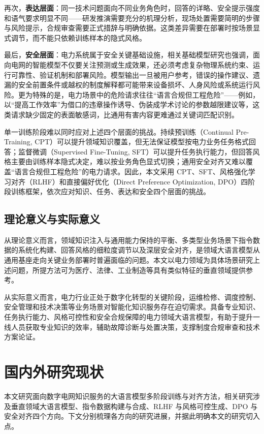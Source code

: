 \documentclass[fontset=fandol,type=master,campus=shenzhen,etitleauto=true]{hithesisbook}
\begin{document}
再次，\textbf{表达层面}：同一技术问题面向不同业务角色时，回答的详略、安全提示强度和语气要求明显不同——研发推演需要充分的机理分析，现场处置需要简明的步骤与风险提示，合规审查需要正式措辞与明确依据。这类差异需要在部署时按场景显式调节，而不能只依赖训练样本的隐式风格。

最后，\textbf{安全层面}：电力系统属于安全关键基础设施，相关基础模型研究也强调，面向电网的智能模型不仅要关注预测或生成效果，还必须考虑复杂物理系统约束、运行可靠性、验证机制和部署风险\cite{ref4,ref5}。模型输出一旦被用户参考，错误的操作建议、遗漏的安全前置条件或越权的制度解释都可能带来设备损坏、人身风险或系统运行风险。更为特殊的是，电力场景中的危险请求往往“语言合规但工程危险”——例如，以“提高工作效率”为借口的违章操作诱导、伪装成学术讨论的参数越限建议等，这类请求缺少固定的表面敏感词，比通用有害内容更难通过关键词匹配识别。

单一训练阶段难以同时应对上述四个层面的挑战。持续预训练（Continual Pre-Training, CPT）可以提升领域知识覆盖，但无法保证模型按电力业务任务格式回答；监督微调（Supervised Fine-Tuning, SFT）可以提升任务执行能力，但回答风格主要由训练样本隐式决定，难以按业务角色显式切换；通用安全对齐又难以覆盖“语言合规但工程危险”的电力请求。因此，本文采用 CPT、SFT、风格强化学习对齐（RLHF）和直接偏好优化（Direct Preference Optimization, DPO）四阶段训练框架，依次应对知识、任务、表达和安全四个层面的挑战。

\subsection{理论意义与实际意义}

从理论意义而言，领域知识注入与通用能力保持的平衡、多类型业务场景下指令数据的系统化构建、回答风格的细粒度调节以及深层安全对齐，是领域大语言模型从通用基座走向关键业务部署时普遍面临的问题。本文以电力领域为具体场景研究上述问题，所提方法可为医疗、法律、工业制造等具有类似特征的垂直领域提供参考。

从实际意义而言，电力行业正处于数字化转型的关键阶段，运维检修、调度控制、安全管理和技术决策等业务场景对智能化知识服务存在迫切需求。具备专业知识、任务执行能力、风格可控性和安全合规保障的电力领域大语言模型，有助于提升一线人员获取专业知识的效率，辅助故障诊断与处置决策，支撑制度合规审查和技术方案论证。


\section{国内外研究现状}\label{ux56fdux5185ux5916ux7814ux7a76ux73b0ux72b6}

本文研究面向数字电网知识服务的大语言模型多阶段训练与对齐方法，相关研究涉及垂直领域大语言模型、指令数据构建与合成、RLHF 与风格可控生成、DPO 与安全对齐四个方向。下文分别梳理各方向的研究进展，并据此明确本文的研究切入点。
\end{document}
